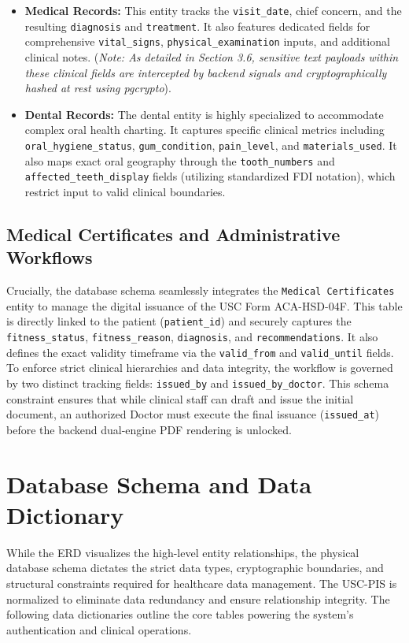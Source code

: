 \begin{itemize}
    \item \textbf{Medical Records:} This entity tracks the \texttt{visit\_date}, chief concern, and the resulting \texttt{diagnosis} and \texttt{treatment}. It also features dedicated fields for comprehensive \texttt{vital\_signs}, \texttt{physical\_examination} inputs, and additional clinical notes. (\textit{Note: As detailed in Section 3.6, sensitive text payloads within these clinical fields are intercepted by backend signals and cryptographically hashed at rest using pgcrypto}).
    \item \textbf{Dental Records:} The dental entity is highly specialized to accommodate complex oral health charting. It captures specific clinical metrics including \texttt{oral\_hygiene\_status}, \texttt{gum\_condition}, \texttt{pain\_level}, and \texttt{materials\_used}. It also maps exact oral geography through the \texttt{tooth\_numbers} and \texttt{affected\_teeth\_display} fields (utilizing standardized FDI notation), which restrict input to valid clinical boundaries.
\end{itemize}

\subsection{Medical Certificates and Administrative Workflows}
Crucially, the database schema seamlessly integrates the \texttt{Medical Certificates} entity to manage the digital issuance of the USC Form ACA-HSD-04F. This table is directly linked to the patient (\texttt{patient\_id}) and securely captures the \texttt{fitness\_status}, \texttt{fitness\_reason}, \texttt{diagnosis}, and \texttt{recommendations}. It also defines the exact validity timeframe via the \texttt{valid\_from} and \texttt{valid\_until} fields. To enforce strict clinical hierarchies and data integrity, the workflow is governed by two distinct tracking fields: \texttt{issued\_by} and \texttt{issued\_by\_doctor}. This schema constraint ensures that while clinical staff can draft and issue the initial document, an authorized Doctor must execute the final issuance (\texttt{issued\_at}) before the backend dual-engine PDF rendering is unlocked.

\section{Database Schema and Data Dictionary}
While the ERD visualizes the high-level entity relationships, the physical database schema dictates the strict data types, cryptographic boundaries, and structural constraints required for healthcare data management. The USC-PIS is normalized to eliminate data redundancy and ensure relationship integrity. The following data dictionaries outline the core tables powering the system's authentication and clinical operations.

